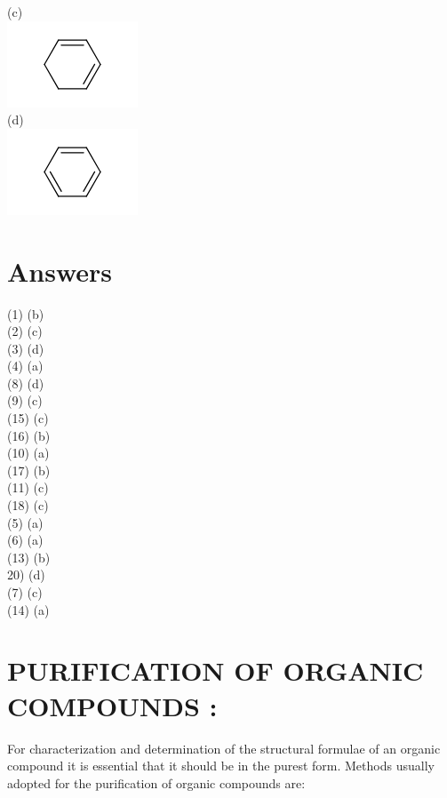\documentclass[10pt]{article}
\begin{document}
\begin{enumerate}
(c)\\
\includegraphics{smile-0447272a623c86dc03885e953141490e3e0202fe}\\
(d)\\
\includegraphics{smile-c48f20a5b83fce06c159b7b57747486d929f254e}
\end{enumerate}

\section*{Answers}
(1) (b)\\
(2) (c)\\
(3) (d)\\
(4) (a)\\
(8) (d)\\
(9) (c)\\
(15) (c)\\
(16) (b)\\
(10) (a)\\
(17) (b)\\
(11) (c)\\
(18) (c)\\
(5) (a)\\
(6) (a)\\
(13) (b)\\
20) (d)\\
(7) (c)\\
(14) (a)

\section*{PURIFICATION OF ORGANIC COMPOUNDS :}
For characterization and determination of the structural formulae of an organic compound it is essential that it should be in the purest form. Methods usually adopted for the purification of organic compounds are:
\end{document}
